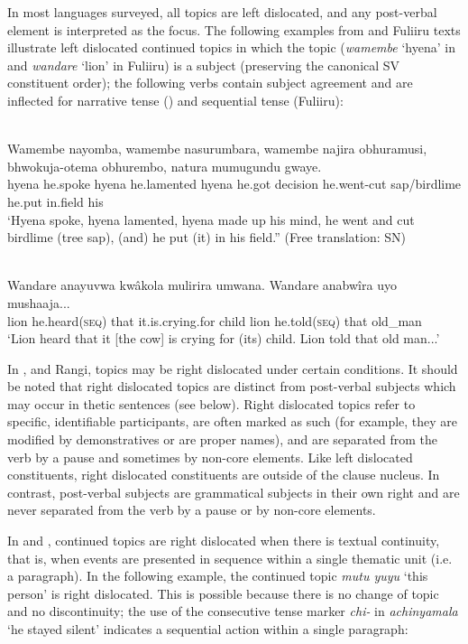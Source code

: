 \documentclass[output=paper]{langsci/langscibook}
\begin{document}
In most languages surveyed, all topics are left dislocated, and any post-verbal element is interpreted as the focus. The following examples from  and Fuliiru texts illustrate left dislocated continued topics in which the topic (\textit{wamembe} ‘hyena’ in  and \textit{wandare} ‘lion’ in Fuliiru) is a subject (preserving the canonical SV constituent order); the following verbs contain subject agreement and are inflected for narrative tense () and sequential tense (Fuliiru):

\ea\label{ex:9.nicolle}
\\
\gll Wamembe nayomba, wamembe nasurumbara, wamembe najira obhuramusi, bhwokuja-otema obhurembo, natura mumugundu gwaye.\\
     hyena he.spoke hyena he.lamented hyena he.got decision he.went-cut sap/birdlime he.put in.field his \\
\glt ‘Hyena spoke, hyena lamented, hyena made up his mind, he went and cut birdlime (tree sap), (and) he put (it) in his field.” (Free translation: SN)
\z

\ea\label{ex:10.nicolle}
\\
\gll Wandare anayuvwa kwâkola mulirira umwana. Wandare anabwîra uyo mushaaja...\\
lion he.heard(\textsc{seq}) that it.is.crying.for child lion he.told(\textsc{seq}) that old\_man  \\
\glt ‘\textup{Lion heard that it [the cow] is crying for (its) child. Lion told that old man...’}
\z

In ,  and Rangi, topics may be right dislocated under certain conditions. It should be noted that right dislocated topics are distinct from post-verbal subjects which may occur in thetic sentences (see  below). Right dislocated topics refer to specific, identifiable participants, are often marked as such (for example, they are modified by demonstratives or are proper names), and are separated from the verb by a pause and sometimes by non-core elements. Like left dislocated constituents, right dislocated constituents are outside of the clause nucleus. In contrast, post-verbal subjects are grammatical subjects in their own right and are never separated from the verb by a pause or by non-core elements.

In  and , continued topics are right dislocated when there is textual continuity, that is, when events are presented in sequence within a single thematic unit (i.e. a paragraph). In the following example, the continued topic \textit{mutu yuyu} ‘this person’ is right dislocated. This is possible because there is no change of topic and no discontinuity; the use of the consecutive tense marker \textit{chi-} in \textit{achinyamala} ‘he stayed silent’ indicates a sequential action within a single paragraph:
\end{document}
